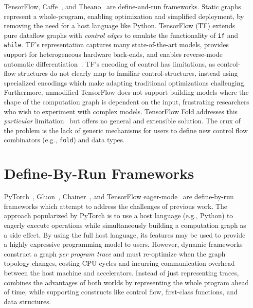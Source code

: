 TensorFlow, Caffe~\citep{caffe}, and Theano~\citep{theano} are define-and-run frameworks.
Static graphs represent a whole-program,
  enabling optimization and simplified deployment,
  by removing the need for a host language like Python.
TensorFlow (TF) extends pure dataflow graphs with \textit{control edges}
      to emulate the functionality of \verb|if| and \verb|while|.
TF's representation captures many state-of-the-art models,
      provides support for heterogeneous hardware back-ends,
      and enables reverse-mode automatic differentiation~{\citep{ad_survey, tensorflow}}.
TF's encoding of control has limitations, as control-flow structures
    do not clearly map to familiar control-structures, instead using specialized
    encodings which make adapting traditional optimizations challenging.
Furthermore,
    unmodified TensorFlow does not support building models where the shape of
    the computation graph is dependent on the input,
    frustrating researchers who wish to experiment with complex models.
TensorFlow Fold addresses this \textit{particular} limitation~\citep{tensorflowfold}
    but offers no general and extensible solution.
The crux of the problem is the lack of generic mechanisms for users to
    define new control flow combinators (e.g., \verb|fold|) and data types.

\section{Define-By-Run Frameworks}
PyTorch~\citep{pytorch_ad}, Gluon~\citep{gluon}, Chainer~\citep{chainer_learningsys2015},
    and TensorFlow eager-mode~\citep{tf_eager} are define-by-run frameworks which
    attempt to address the challenges of previous work.
The approach popularized by PyTorch is to use a host language (e.g., Python)
    to eagerly execute operations while simultaneously building a computation graph
    as a side effect.
By using the full host language,
  its features may be used to provide a highly expressive programming model to users.
However, dynamic frameworks construct a graph \textit{per program trace} and must re-optimize when
    the graph topology changes, costing CPU cycles and incurring communication overhead between the host
    machine and accelerators.
Instead of just representing traces, \relay combines the advantages of both worlds by
    representing the whole program ahead of time,
    while supporting constructs like control flow, first-class functions, and data structures.

